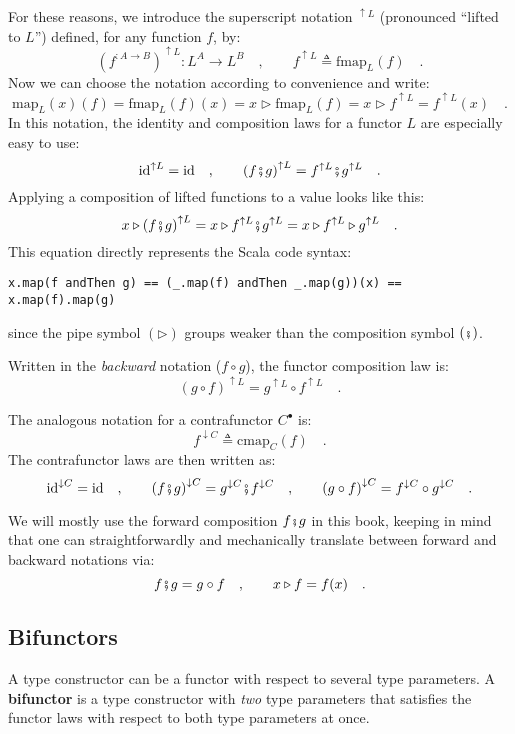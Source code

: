 For these reasons, we introduce the superscript notation $^{\uparrow L}$
(pronounced \textsf{``}lifted to $L$\textsf{''}) defined, for any function $f$,
by:
\[
(f^{:A\rightarrow B})^{\uparrow L}:L^{A}\rightarrow L^{B}\quad,\quad\quad f^{\uparrow L}\triangleq\text{fmap}_{L}(f)\quad.
\]
Now we can choose the notation according to convenience and write:
\[
\text{map}_{L}(x)(f)=\text{fmap}_{L}(f)(x)=x\triangleright\text{fmap}_{L}(f)=x\triangleright f^{\uparrow L}=f^{\uparrow L}(x)\quad.
\]
In this notation, the identity and composition laws for a functor
$L$ are especially easy to use:
\[
\text{id}^{\uparrow L}=\text{id}\quad,\quad\quad\left(f\bef g\right)^{\uparrow L}=f^{\uparrow L}\bef g^{\uparrow L}\quad.
\]
Applying a composition of lifted functions to a value looks like this:
\[
x\triangleright\left(f\bef g\right)^{\uparrow L}=x\triangleright f^{\uparrow L}\bef g^{\uparrow L}=x\triangleright f^{\uparrow L}\triangleright g^{\uparrow L}\quad.
\]
This equation directly represents the Scala code syntax:
\begin{lstlisting}
x.map(f andThen g) == (_.map(f) andThen _.map(g))(x) == x.map(f).map(g)
\end{lstlisting}
since the pipe symbol $\left(\triangleright\right)$ groups weaker
than the composition symbol $\left(\bef\right)$.

Written in the \emph{backward} notation ($f\circ g$), the functor
composition law is:
\[
\left(g\circ f\right)^{\uparrow L}=g^{\uparrow L}\circ f^{\uparrow L}\quad.
\]

The analogous notation for a contrafunctor $C^{\bullet}$ is:
\[
f^{\downarrow C}\triangleq\text{cmap}_{C}(f)\quad.
\]
The contrafunctor laws are then written as:
\[
\text{id}^{\downarrow C}=\text{id}\quad,\quad\quad\left(f\bef g\right)^{\downarrow C}=g^{\downarrow C}\bef f^{\downarrow C}\quad,\quad\quad\left(g\circ f\right)^{\downarrow C}=f^{\downarrow C}\circ g^{\downarrow C}\quad.
\]

We will mostly use the forward composition $f\bef g$ in this book,
keeping in mind that one can straightforwardly and mechanically translate
between forward and backward notations via:
\[
f\bef g=g\circ f\quad,\quad\quad x\triangleright f=f(x)\quad.
\]


\subsection{Bifunctors\label{subsec:Bifunctors}}

A type constructor can be a functor with respect to several type parameters.
A \textbf{bifunctor} is a type constructor with
\emph{two} type parameters that satisfies the functor laws with respect
to both type parameters at once.

